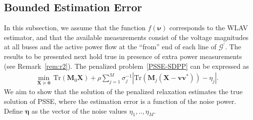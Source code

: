 \documentclass[journal,twoside]{IEEEtran}
\newcommand{\Tr}{\mathrm{Tr}}
\newcommand{\st}{\mathrm{subject~to}}
\newcommand{\bv}{\mathbf{v}}
\newcommand{\bM}{\mathbf{M}}
\newcommand{\bX}{\mathbf{X}}
\newcommand{\bnu}{\bm{\nu}}
\newcommand{\tbv}{\tilde{\mathbf{v}}}
\newcommand{\cG}{{\mathcal G}}
\newcommand{\cL}{{\mathcal L}}
\newcommand{\cM}{{\mathcal M}}
\newcommand{\cN}{{\mathcal N}}
\DeclareMathOperator*{\mini}{\mathrm{minimize}}
\begin{document}
\subsection{Bounded Estimation Error}
In this subsection, we assume that the function $f(\bnu)$ corresponds to the WLAV estimator, and that the available measurements consist of the voltage magnitudes at all buses and the active power flow at the ``from'' end of each line of $\cG^{\prime}$. The results to be presented next hold true in presence of extra  power measurements (see Remark~\ref{rem:r2}).
The penalized  problem~\eqref{PSSE-SDPP} can  be expressed as
\begin{align}\label{PSSE-SDPP2}
\min_{\bX \succeq \mathbf{0}}\, \Tr(\bM_0\bX)\!+\!\rho \sum_{j=1}^M \sigma_j^{-1}\left|\Tr\left(\bM_j(\bX\!-\!\bv\bv^{*})\right)\!-\!\eta_j\right|.
\end{align}
We aim to show that the solution of the penalized  relaxation  estimates the true solution of PSSE, where the estimation error is a function of the noise power. Define $\boldsymbol{\eta}$ as the vector of the noise values $\eta_1,..,\eta_M$.

%
\end{document}
